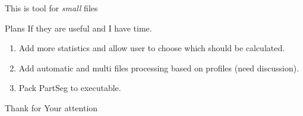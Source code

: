 \documentclass[10pt,usenames,dvipsnames]{beamer}
\begin{document}
\begin{frame}[standout]{}
  This is tool for \emph{small} files  
\end{frame}
\begin{frame}[c]{Plans}
  If they are useful and I have time.  
  \begin{enumerate}
    \item Add more statistics and allow user to choose which should be calculated.
    \item Add automatic and multi files processing based on profiles (need discussion).
    \item Pack PartSeg to executable. 
  \end{enumerate}  
\end{frame}
\begin{frame}
  \begin{center}
    \Huge Thank for Your attention
  \end{center}
\end{frame}
\end{document}
